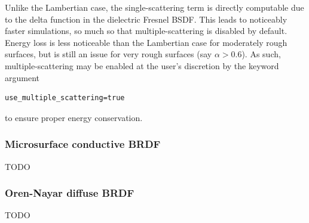 \documentclass[
    twoside,
    twocolumn,
    letterpaper,
    10pt]{article}
\begin{document}
Unlike the Lambertian case, the single-scattering term is directly 
computable due to the delta function 
in the dielectric Fresnel BSDF. This leads to noticeably faster
simulations, so much so that multiple-scattering is disabled by 
default. Energy loss is less noticeable than the Lambertian case
for moderately rough surfaces,
but is still an issue for very rough surfaces 
(say $\alpha > 0.6$). As such, multiple-scattering may be 
enabled at the user's discretion by the keyword argument
\begin{lstlisting}
use_multiple_scattering=true
\end{lstlisting}
to ensure proper energy conservation.


\subsubsection{Microsurface conductive BRDF}
\label{sec:doc-layers-microsurface-conductive}

TODO

\subsubsection{Oren-Nayar diffuse BRDF}
\label{sec:doc-layers-oren-nayar-diffuse}

TODO

{
\nocite{*}
\raggedright
\printbibliography
}
\end{document}
